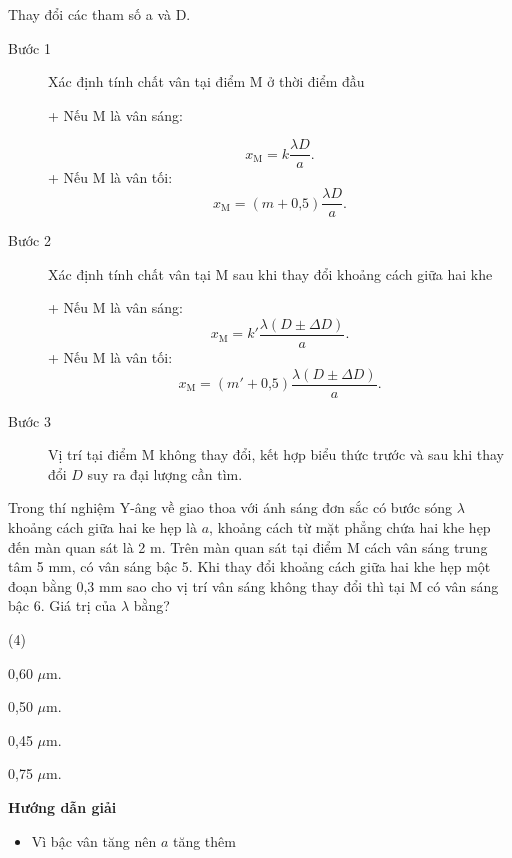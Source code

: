 \begin{dang}{Thay đổi các tham số a và D.}
{		\begin{description}
			\item[Bước 1]  Xác định tính chất vân tại điểm M ở thời điểm đầu 
			
			+ Nếu M là vân sáng:
			
			\begin{equation}
				x_{\text{M}}=k\dfrac{\lambda D}{a}.
			\end{equation}
			+ Nếu M là vân tối:
			\begin{equation}
				x_{\text{M}}=(m+\text{0,5})\dfrac{\lambda D}{a}.
			\end{equation}
			\item [Bước 2] Xác định tính chất vân tại M sau khi thay đổi khoảng cách giữa hai khe
			
			+ Nếu M là vân sáng:
			\begin{equation}
				x_{\text{M}}=k'\dfrac{\lambda (D \pm \Delta D)}{a}.
			\end{equation}
			+ Nếu M là vân tối:
			\begin{equation}
				x_{\text{M}}=(m'+\text{0,5})\dfrac{\lambda (D \pm \Delta D)}{a}.
			\end{equation}
			\item [Bước 3] Vị trí tại điểm M không thay đổi, kết hợp biểu thức trước và sau khi thay đổi $D$ suy ra đại lượng cần tìm.
		\end{description}
	}
	
	
	
	{
		Trong  thí nghiệm Y-âng về giao thoa với ánh sáng đơn sắc có bước sóng $\lambda$  khoảng cách giữa hai ke hẹp là $a$, khoảng cách từ mặt phẳng chứa hai khe hẹp đến màn quan sát là 2 m. Trên màn quan sát tại điểm M cách vân sáng trung tâm 5 mm, có vân sáng bậc 5. Khi thay đổi khoảng cách giữa hai khe hẹp một đoạn bằng 0,3 mm sao cho vị trí vân sáng không thay đổi thì tại M có vân sáng bậc 6. Giá trị của $\lambda$  bằng?
		\begin{mcq}(4)
			\item 0,60 $\mu$m.		
			\item 0,50 $\mu$m.		
			\item 0,45 $\mu$m.		
			\item 0,75 $\mu$m.	
	\end{mcq}}
	{\begin{center}
			\textbf{Hướng dẫn giải}
		\end{center}
		\begin{itemize}
			\item Vì bậc vân tăng nên $a$ tăng thêm
			

\end{itemize}}
\end{dang}
